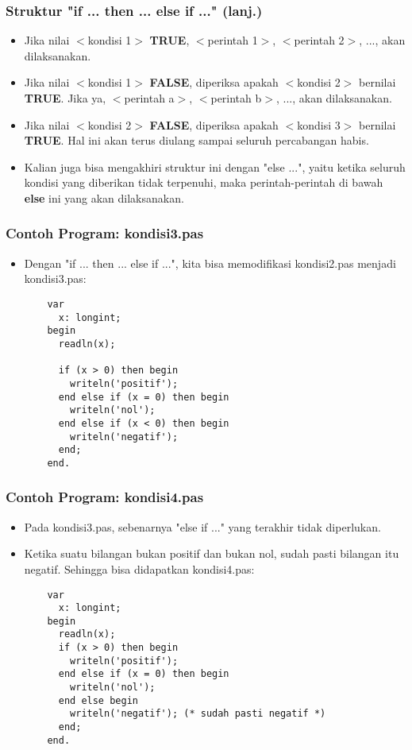 \begin{frame}
\frametitle{Struktur "if ... then ... else if ..." (lanj.)}
\begin{itemize}
  \item Jika nilai $<$kondisi 1$>$ \textbf{TRUE}, $<$perintah 1$>$, $<$perintah 2$>$, ..., akan dilaksanakan.
  \item Jika nilai $<$kondisi 1$>$ \textbf{FALSE}, diperiksa apakah $<$kondisi 2$>$ bernilai \textbf{TRUE}. Jika ya, $<$perintah a$>$, $<$perintah b$>$, ..., akan dilaksanakan.
  \item Jika nilai $<$kondisi 2$>$ \textbf{FALSE}, diperiksa apakah $<$kondisi 3$>$ bernilai \textbf{TRUE}. Hal ini akan terus diulang sampai seluruh percabangan habis.
  \item Kalian juga bisa mengakhiri struktur ini dengan "else ...", yaitu ketika seluruh kondisi yang diberikan tidak terpenuhi, maka perintah-perintah di bawah \textbf{else} ini yang akan dilaksanakan.
\end{itemize}
\end{frame}

\begin{frame}[fragile]
\frametitle{Contoh Program: kondisi3.pas}
\begin{itemize}
  \item Dengan "if ... then ... else if ...", kita bisa memodifikasi kondisi2.pas menjadi kondisi3.pas:
  \begin{lstlisting}
    var
      x: longint;
    begin
      readln(x);

      if (x > 0) then begin
        writeln('positif');
      end else if (x = 0) then begin
        writeln('nol');
      end else if (x < 0) then begin
        writeln('negatif');
      end;
    end.
  \end{lstlisting}
\end{itemize}
\end{frame}

\begin{frame}[fragile]
\frametitle{Contoh Program: kondisi4.pas}
\begin{itemize}
  \item Pada kondisi3.pas, sebenarnya "else if ..." yang terakhir tidak diperlukan.
  \item Ketika suatu bilangan bukan positif dan bukan nol, sudah pasti bilangan itu negatif. Sehingga bisa didapatkan kondisi4.pas:
  \begin{lstlisting}
    var
      x: longint;
    begin
      readln(x);
      if (x > 0) then begin
        writeln('positif');
      end else if (x = 0) then begin
        writeln('nol');
      end else begin
        writeln('negatif'); (* sudah pasti negatif *)
      end;
    end.
  \end{lstlisting}
\end{itemize}
\end{frame}


